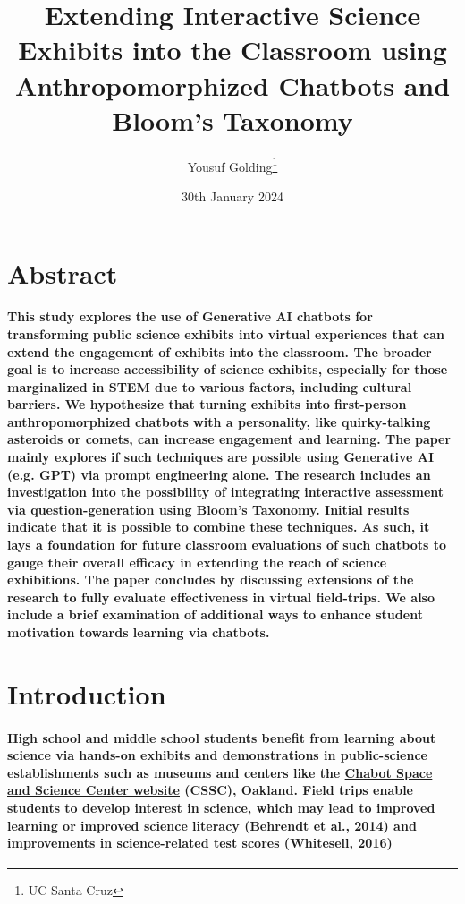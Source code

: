 \documentclass{article}
\title{Extending Interactive Science Exhibits into the Classroom using Anthropomorphized Chatbots and Bloom’s Taxonomy}
\author{Yousuf Golding\thanks{UC Santa Cruz}}
\date{30th January 2024}
\begin{document}
\maketitle

\section*{Abstract}

\paragraph{This study explores the use of Generative AI chatbots for transforming public science exhibits into virtual experiences that can extend the engagement of exhibits into the classroom. The broader goal is to increase accessibility of science exhibits, especially for those marginalized in STEM due to various factors, including cultural barriers. We hypothesize that turning exhibits into first-person anthropomorphized chatbots with a personality, like quirky-talking asteroids or comets, can increase engagement and learning. The paper mainly explores if such techniques are possible using Generative AI (e.g. GPT) via prompt engineering alone. The research includes an investigation into the possibility of integrating interactive assessment via question-generation using Bloom’s Taxonomy. Initial results indicate that it is possible to combine these techniques. As such, it lays a foundation for future classroom evaluations of such chatbots to gauge their overall efficacy in extending the reach of science exhibitions. The paper concludes by discussing extensions of the research to fully evaluate effectiveness in virtual  field-trips. We also include a brief examination of additional ways to enhance student motivation towards learning via chatbots.}

\section*{Introduction}

\paragraph{High school and middle school students benefit from learning about science via hands-on exhibits and demonstrations in public-science establishments such as museums and centers like the \href{https://chabotspace.org/}{Chabot Space and Science Center website} (CSSC), Oakland. Field trips enable students to develop interest in science, which may lead to improved learning or improved science literacy (Behrendt et al., 2014) and improvements in science-related test scores (Whitesell, 2016)}
\end{document}
